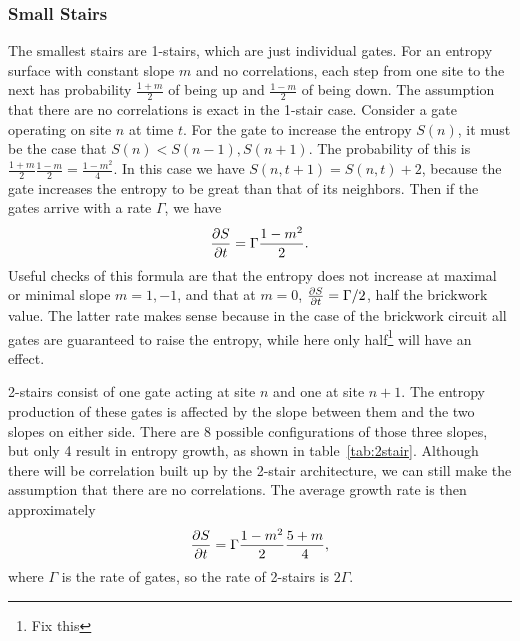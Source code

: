 \subsubsection{Small Stairs} \label{subsub:smallstairs} \emph{}

The smallest stairs are 1-stairs, which are just individual gates. For an entropy surface with constant slope $m$ and no correlations, each step from one site to the next has probability $\frac{1+m}{2}$ of being up and $\frac{1-m}{2}$ of being down. The assumption that there are no correlations is exact in the 1-stair case. Consider a gate operating on site $n$ at time $t$. For the gate to increase the entropy $S(n)$, it must be the case that $S(n)<S(n-1), S(n+1)$. The probability of this is $\frac{1+m}{2} \frac{1-m}{2} = \frac{1-m^2}{4}$. In this case we have $S(n,t+1)=S(n,t)+2$, because the gate increases the entropy to be great than that of its neighbors. Then if the gates arrive with a rate $\Gamma$, we have
\begin{align}
\frac{\partial S}{\partial t} = \Gamma\frac{1-m^2}{2}.
\end{align}
Useful checks of this formula are that the entropy does not increase at maximal or minimal slope $m=1,-1$, and that at $m=0$, $\frac{\partial S}{\partial t}=\Gamma/2$, half the brickwork value. The latter rate makes sense because in the case of the brickwork circuit all gates are guaranteed to raise the entropy, while here only half\footnote{Fix this} will have an effect.

2-stairs consist of one gate acting at site $n$ and one at site $n+1$. The entropy production of these gates is affected by the slope between them and the two slopes on either side. There are 8 possible configurations of those three slopes, but only 4 result in entropy growth, as shown in table~\ref{tab:2stair}. Although there will be correlation built up by the 2-stair architecture, we can still make the assumption that there are no correlations. The average growth rate is then approximately 
\begin{align}
\frac{\partial S}{\partial t} = \Gamma\frac{1-m^2}{2}\frac{5+m}{4},
\end{align}
where $\Gamma$ is the rate of gates, so the rate of 2-stairs is $2\Gamma$.


